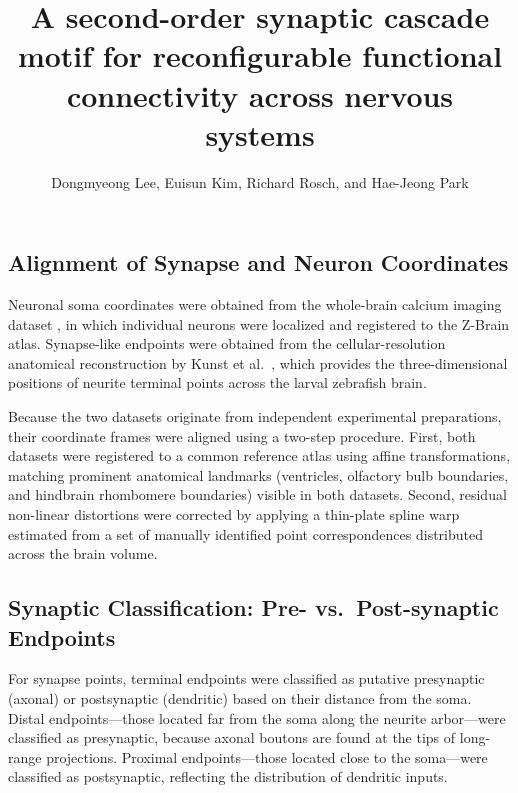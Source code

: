 \documentclass[9pt,twoside]{pnas-new}
\title{A second-order synaptic cascade motif for reconfigurable functional connectivity across nervous systems}
\author{Dongmyeong Lee, Euisun Kim, Richard Rosch, and Hae-Jeong Park}
\begin{document}
\maketitle

\SItext


\subsection*{Alignment of Synapse and Neuron Coordinates}

Neuronal soma coordinates were obtained from the whole-brain calcium imaging dataset \citep{chen2018brain}, in which individual neurons were localized and registered to the Z-Brain atlas. Synapse-like endpoints were obtained from the cellular-resolution anatomical reconstruction by Kunst et al.\ \citep{kunst2019cellular}, which provides the three-dimensional positions of neurite terminal points across the larval zebrafish brain.

Because the two datasets originate from independent experimental preparations, their coordinate frames were aligned using a two-step procedure. First, both datasets were registered to a common reference atlas using affine transformations, matching prominent anatomical landmarks (ventricles, olfactory bulb boundaries, and hindbrain rhombomere boundaries) visible in both datasets. Second, residual non-linear distortions were corrected by applying a thin-plate spline warp estimated from a set of manually identified point correspondences distributed across the brain volume.

\subsection*{Synaptic Classification: Pre- vs.\ Post-synaptic Endpoints}

For synapse points, terminal endpoints were classified as putative presynaptic (axonal) or postsynaptic (dendritic) based on their distance from the soma. Distal endpoints---those located far from the soma along the neurite arbor---were classified as presynaptic, because axonal boutons are found at the tips of long-range projections. Proximal endpoints---those located close to the soma---were classified as postsynaptic, reflecting the distribution of dendritic inputs.
\end{document}
